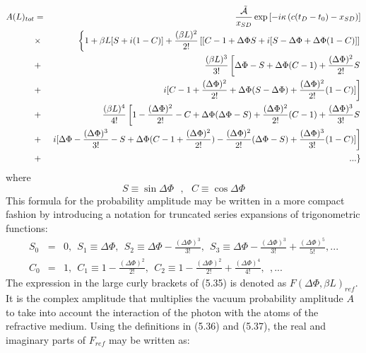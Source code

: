 \documentclass [12pt]{article}
\begin{document}
{ \begin{eqnarray}
      A(L)_{tot} & = &  \frac{\tilde{{\cal A}}}{x_{SD}}
   \exp\left[ - i \kappa\left(c(t_D-t_0)-x_{SD}\right)\right] \nonumber \\
        & \times & \left\{1 + \beta L[S+i(1-C)] +  \frac{(\beta L)^2}{2!}\left[[
         C-1+\Delta \Phi S  + i[S-\Delta \Phi +\Delta \Phi (1-C)]\right] \right. \nonumber \\
        & + & \frac{(\beta L)^3}{3!}\left[\Delta \Phi - S +\Delta \Phi (C-1) +\frac{(\Delta \Phi)^2}{2!}S
          \right. \nonumber \\
       & + & \left. i[C-1+\frac{(\Delta \Phi)^2}{2!}+ \Delta \Phi(S-\Delta \Phi)
            +\frac{(\Delta \Phi)^2}{2!}(1-C)]\right]  \nonumber \\
        & + &  \frac{(\beta L)^4}{4!} \left[
            1-\frac{(\Delta \Phi)^2}{2!}-C+ \Delta \Phi(\Delta \Phi-S)+
            \frac{(\Delta \Phi)^2}{2!}(C-1)+\frac{(\Delta \Phi)^3}{3!}S \right.  \nonumber \\
         &+& \left. i[ \Delta \Phi - \frac{(\Delta \Phi)^3}{3!} -S +
         \Delta \Phi (C-1 +\frac{(\Delta \Phi)^2}{2!} )- \frac{(\Delta \Phi)^2}{2!}(\Delta \Phi-S)
          + \frac{(\Delta \Phi)^3}{3!}(1-C)]\right] \nonumber \\
        & + & \left. ...\right\}
   \end{eqnarray}
    where
  \[ S\equiv \sin \Delta \Phi~~~,~~~ C\equiv \cos \Delta \Phi \]
    This formula for the probability amplitude may be written in a more compact fashion by introducing
    a notation for truncated series expansions of trigonometric functions: 
 \begin{eqnarray}
     S_0 & = & 0,~~ S_1 \equiv  \Delta \Phi,~~ S_2 \equiv \Delta \Phi-  \frac{(\Delta \Phi)^3}{3!},~~
      S_3 \equiv \Delta \Phi-  \frac{(\Delta \Phi)^3}{3!}+ \frac{(\Delta \Phi)^5}{5!} ,...\\
   C_0 & = & 1,~~ C_1 \equiv  1- \frac{(\Delta \Phi)^2}{2!},~~ C_2 \equiv 1- \frac{(\Delta \Phi)^2}{2!}
       + \frac{(\Delta \Phi)^4}{4!},~~ , ...
   \end{eqnarray}
    The expression in the large curly brackets of (5.35) is denoted as $F(\Delta \Phi,\beta L)_{ref}$.
    It is the complex amplitude that multiplies the vacuum probability amplitude $A$
    to take into account the interaction of
    the photon with the atoms of the refractive medium. Using the definitions in (5.36) and (5.37), 
    the real and imaginary parts of  $F_{ref}$ may be written as:
   \begin{eqnarray}

\end{eqnarray}}
\end{document}
